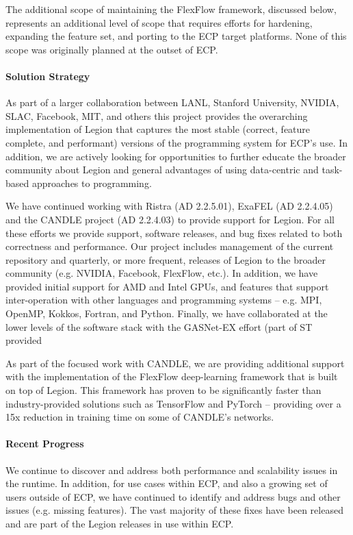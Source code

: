 The additional scope of maintaining the FlexFlow framework, discussed
below, represents an additional level of scope that requires efforts
for hardening, expanding the feature set, and porting to the ECP
target platforms.  None of this scope was originally planned at the
outset of ECP. 

\paragraph{Solution Strategy}
As part of a larger collaboration between LANL, Stanford University,
NVIDIA, SLAC, Facebook, MIT, and others this project provides the
overarching implementation of Legion that captures the most stable
(correct, feature complete, and performant) versions of the programming
system for ECP's use.  In addition, we are actively looking for
opportunities to further educate the broader community about Legion
and general advantages of using data-centric and task-based approaches
to programming.

We have continued working with Ristra (AD 2.2.5.01), ExaFEL (AD
2.2.4.05) and the CANDLE project (AD 2.2.4.03) to provide support for
Legion.  For all these efforts we provide support, software releases,
and bug fixes related to both correctness and performance. Our project
includes management of the current repository and quarterly, or more
frequent, releases of Legion to the broader community (e.g. NVIDIA,
Facebook, FlexFlow, etc.).  In addition, we have provided initial
support for AMD and Intel GPUs, and features that support
inter-operation with other languages and programming systems --
e.g. MPI, OpenMP, Kokkos, Fortran, and Python. Finally, we have collaborated
at the lower levels of the software stack with the GASNet-EX effort (part
of ST provided

As part of the focused work with CANDLE, we are providing additional
support with the implementation of the FlexFlow deep-learning
framework that is built on top of Legion.  This framework has proven to
be significantly faster than industry-provided solutions such as TensorFlow
and PyTorch -- providing over a 15x reduction in training time on some of
CANDLE's networks. 

\paragraph{Recent Progress}

We continue to discover and address both performance and scalability
issues in the runtime.  In addition, for use cases within ECP, and
also a growing set of users outside of ECP, we have continued to
identify and address bugs and other issues (e.g. missing features).
The vast majority of these fixes have been released and are part of
the Legion releases in use within ECP.

